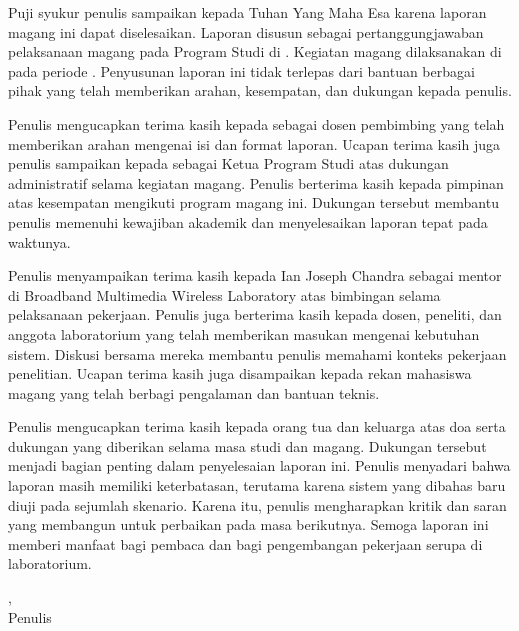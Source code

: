 
\begin{singlespace}
Puji syukur penulis sampaikan kepada Tuhan Yang Maha Esa karena laporan magang
ini dapat diselesaikan. Laporan disusun sebagai pertanggungjawaban pelaksanaan
magang pada Program Studi \ProgramStudi{} di \NamaKampus. Kegiatan magang
dilaksanakan di \InstansiMagang{} pada periode \PeriodeMagang. Penyusunan
laporan ini tidak terlepas dari bantuan berbagai pihak yang telah memberikan
arahan, kesempatan, dan dukungan kepada penulis.

Penulis mengucapkan terima kasih kepada \NamaPembimbing{} sebagai dosen
pembimbing yang telah memberikan arahan mengenai isi dan format laporan.
Ucapan terima kasih juga penulis sampaikan kepada \NamaKetuaProgramStudi{}
sebagai Ketua Program Studi \ProgramStudi{} atas dukungan administratif
selama kegiatan magang. Penulis berterima kasih kepada pimpinan \NamaKampus{}
atas kesempatan mengikuti program magang ini. Dukungan tersebut membantu
penulis memenuhi kewajiban akademik dan menyelesaikan laporan tepat pada
waktunya.

Penulis menyampaikan terima kasih kepada Ian Joseph Chandra sebagai mentor di
Broadband Multimedia Wireless Laboratory atas bimbingan selama pelaksanaan
pekerjaan. Penulis juga berterima kasih kepada dosen, peneliti, dan anggota
laboratorium yang telah memberikan masukan mengenai kebutuhan sistem. Diskusi
bersama mereka membantu penulis memahami konteks pekerjaan penelitian. Ucapan
terima kasih juga disampaikan kepada rekan mahasiswa magang yang telah
berbagi pengalaman dan bantuan teknis.

Penulis mengucapkan terima kasih kepada orang tua dan keluarga atas doa serta
dukungan yang diberikan selama masa studi dan magang. Dukungan tersebut
menjadi bagian penting dalam penyelesaian laporan ini. Penulis menyadari bahwa
laporan masih memiliki keterbatasan, terutama karena sistem yang dibahas baru
diuji pada sejumlah skenario. Karena itu, penulis mengharapkan kritik dan
saran yang membangun untuk perbaikan pada masa berikutnya. Semoga laporan ini
memberi manfaat bagi pembaca dan bagi pengembangan pekerjaan serupa di
laboratorium.

\vspace{2\baselineskip}
\begin{flushright}
\Kota, \TanggalKataPengantar\\[2\baselineskip]
Penulis
\end{flushright}
\end{singlespace}

